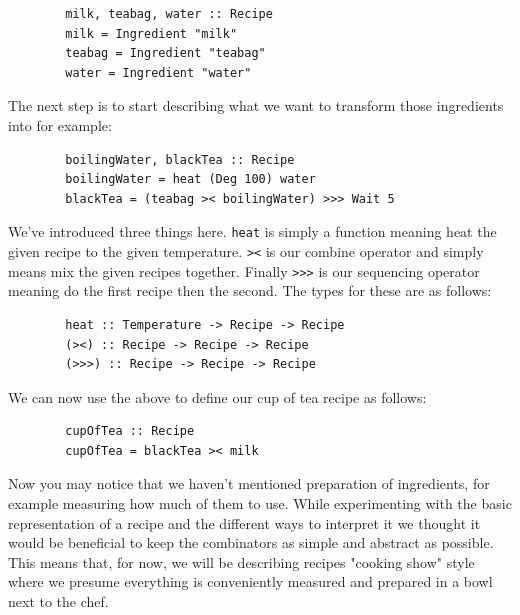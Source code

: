 \documentclass[11pt]{article}
\begin{document}
    \begin{tt}
    \small
    \begin{lstlisting}
        milk, teabag, water :: Recipe
        milk = Ingredient "milk"
        teabag = Ingredient "teabag"
        water = Ingredient "water"
    \end{lstlisting}
    \end{tt}

    The next step is to start describing what we want to transform
    those ingredients into for example:

    \begin{tt}
    \small
    \begin{lstlisting}
        boilingWater, blackTea :: Recipe
        boilingWater = heat (Deg 100) water
        blackTea = (teabag >< boilingWater) >>> Wait 5
    \end{lstlisting}
    \end{tt}

    We've introduced three things here. \texttt{heat} is simply
    a function meaning heat the given recipe to the given temperature.
    \texttt{><} is our combine operator and simply means mix the
    given recipes together. Finally \texttt{>>>} is our sequencing
    operator meaning do the first recipe then the second. The types
    for these are as follows:
    
    \begin{tt}
    \small
    \begin{lstlisting}
        heat :: Temperature -> Recipe -> Recipe
        (><) :: Recipe -> Recipe -> Recipe
        (>>>) :: Recipe -> Recipe -> Recipe
    \end{lstlisting}
    \end{tt}

    We can now use the above to define our cup of tea recipe as follows:

    \begin{tt}
    \small
    \begin{lstlisting}
        cupOfTea :: Recipe
        cupOfTea = blackTea >< milk
    \end{lstlisting}
    \end{tt}

    Now you may notice that we haven't mentioned preparation of ingredients,
    for example measuring how much of them to use. While experimenting with
    the basic representation of a recipe and the different ways to interpret
    it we thought it would be beneficial to keep the combinators as simple
    and abstract as possible. This means that, for now, we will be describing
    recipes "cooking show" style where we presume everything is conveniently
    measured and prepared in a bowl next to the chef.
\end{document}
